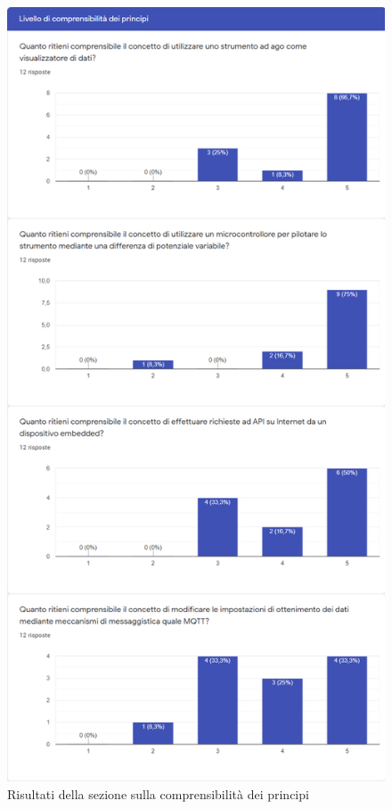 \documentclass[12pt,a4paper]{report}
\begin{document}
\begin{figure}[h]
  \centering
  \includegraphics[width=\textwidth,height=0.95\textheight,keepaspectratio]{ressez3}
  \caption{Risultati della sezione sulla comprensibilità dei principi}
  \label{fig:comprensibilita}
\end{figure}
\end{document}
